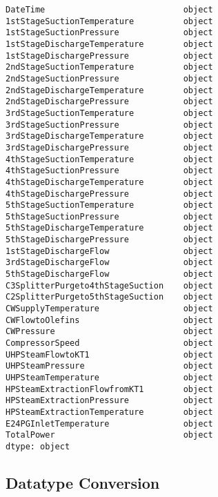 \documentclass[11pt]{article}
\makeatletter
\newcommand{\boxspacing}{\kern\kvtcb@left@rule\kern\kvtcb@boxsep}
\newcommand{\prompt}[4]{
        \ttfamily\llap{{\color{#2}[#3]:\hspace{3pt}#4}}\vspace{-\baselineskip}
    }
\makeatother
\begin{document}
            \begin{tcolorbox}[breakable, size=fbox, boxrule=.5pt, pad at break*=1mm, opacityfill=0]
\prompt{Out}{outcolor}{16}{\boxspacing}
\begin{Verbatim}[commandchars=\\\{\}]
DateTime                            object
1stStageSuctionTemperature          object
1stStageSuctionPressure             object
1stStageDischargeTemperature        object
1stStageDischargePressure           object
2ndStageSuctionTemperature          object
2ndStageSuctionPressure             object
2ndStageDischargeTemperature        object
2ndStageDischargePressure           object
3rdStageSuctionTemperature          object
3rdStageSuctionPressure             object
3rdStageDischargeTemperature        object
3rdStageDischargePressure           object
4thStageSuctionTemperature          object
4thStageSuctionPressure             object
4thStageDischargeTemperature        object
4thStageDischargePressure           object
5thStageSuctionTemperature          object
5thStageSuctionPressure             object
5thStageDischargeTemperature        object
5thStageDischargePressure           object
1stStageDischargeFlow               object
3rdStageDischargeFlow               object
5thStageDischargeFlow               object
C3SplitterPurgeto4thStageSuction    object
C2SplitterPurgeto5thStageSuction    object
CWSupplyTemperature                 object
CWFlowtoOlefins                     object
CWPressure                          object
CompressorSpeed                     object
UHPSteamFlowtoKT1                   object
UHPSteamPressure                    object
UHPSteamTemperature                 object
HPSteamExtractionFlowfromKT1        object
HPSteamExtractionPressure           object
HPSteamExtractionTemperature        object
E24PGInletTemperature               object
TotalPower                          object
dtype: object
\end{Verbatim}
\end{tcolorbox}
        
    \hypertarget{datatype-conversion}{%
\subsection{Datatype Conversion}\label{datatype-conversion}}
\end{document}

